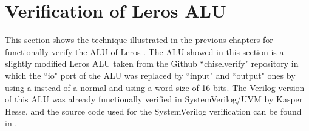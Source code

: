 



\chapter{Verification of Leros ALU}\label{verificationalu}

This section shows the technique illustrated in the previous chapters for
functionally verify the ALU of Leros \cite{online:leros}. The ALU showed in this
section is a slightly modified Leros ALU taken from the Github ``chiselverify"
repository \cite{github:chiselverify} in which the ``io" port of the ALU was
replaced by ``input" and ``output" ones by using a  instead
of a normal  and using a word size of 16-bits. The Verilog version
of this ALU was already functionally verified in SystemVerilog/UVM by Kasper
Hesse, and the source code used for the SystemVerilog verification can be found
in \cite{github:chiselverify}.

